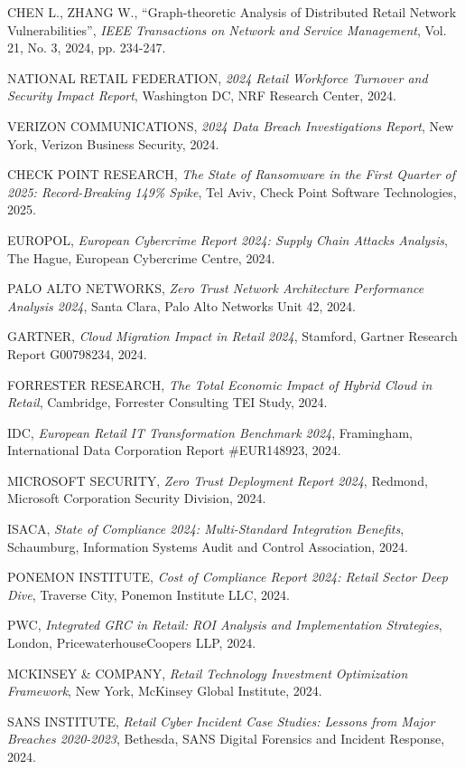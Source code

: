 \begin{thebibliography}{99}
 CHEN L., ZHANG W., ``Graph-theoretic Analysis of Distributed Retail Network Vulnerabilities'', \textit{IEEE Transactions on Network and Service Management}, Vol. 21, No. 3, 2024, pp. 234-247.

 NATIONAL RETAIL FEDERATION, \textit{2024 Retail Workforce Turnover and Security Impact Report}, Washington DC, NRF Research Center, 2024.

 VERIZON COMMUNICATIONS, \textit{2024 Data Breach Investigations Report}, New York, Verizon Business Security, 2024.

 CHECK POINT RESEARCH, \textit{The State of Ransomware in the First Quarter of 2025: Record-Breaking 149\% Spike}, Tel Aviv, Check Point Software Technologies, 2025.

 EUROPOL, \textit{European Cybercrime Report 2024: Supply Chain Attacks Analysis}, The Hague, European Cybercrime Centre, 2024.

 PALO ALTO NETWORKS, \textit{Zero Trust Network Architecture Performance Analysis 2024}, Santa Clara, Palo Alto Networks Unit 42, 2024.

 GARTNER, \textit{Cloud Migration Impact in Retail 2024}, Stamford, Gartner Research Report G00798234, 2024.

 FORRESTER RESEARCH, \textit{The Total Economic Impact of Hybrid Cloud in Retail}, Cambridge, Forrester Consulting TEI Study, 2024.

 IDC, \textit{European Retail IT Transformation Benchmark 2024}, Framingham, International Data Corporation Report \#EUR148923, 2024.

 MICROSOFT SECURITY, \textit{Zero Trust Deployment Report 2024}, Redmond, Microsoft Corporation Security Division, 2024.

 ISACA, \textit{State of Compliance 2024: Multi-Standard Integration Benefits}, Schaumburg, Information Systems Audit and Control Association, 2024.

 PONEMON INSTITUTE, \textit{Cost of Compliance Report 2024: Retail Sector Deep Dive}, Traverse City, Ponemon Institute LLC, 2024.

 PWC, \textit{Integrated GRC in Retail: ROI Analysis and Implementation Strategies}, London, PricewaterhouseCoopers LLP, 2024.

 MCKINSEY \& COMPANY, \textit{Retail Technology Investment Optimization Framework}, New York, McKinsey Global Institute, 2024.

 SANS INSTITUTE, \textit{Retail Cyber Incident Case Studies: Lessons from Major Breaches 2020-2023}, Bethesda, SANS Digital Forensics and Incident Response, 2024.
\end{thebibliography}